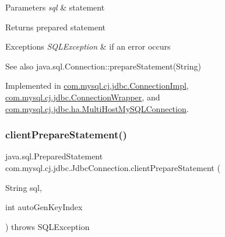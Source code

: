 \begin{DoxyParams}{Parameters}
{\em sql} & statement \\
\hline
\end{DoxyParams}
\begin{DoxyReturn}{Returns}
prepared statement 
\end{DoxyReturn}

\begin{DoxyExceptions}{Exceptions}
{\em S\+Q\+L\+Exception} & if an error occurs \\
\hline
\end{DoxyExceptions}
\begin{DoxySeeAlso}{See also}
java.\+sql.\+Connection\+::prepare\+Statement(\+String) 
\end{DoxySeeAlso}


Implemented in \mbox{\hyperlink{classcom_1_1mysql_1_1cj_1_1jdbc_1_1_connection_impl_a97fe5e29bb844493eb31b4f1c48d8bc7}{com.\+mysql.\+cj.\+jdbc.\+Connection\+Impl}}, \mbox{\hyperlink{classcom_1_1mysql_1_1cj_1_1jdbc_1_1_connection_wrapper_abec439c58b0b01c1590be391a2d1969a}{com.\+mysql.\+cj.\+jdbc.\+Connection\+Wrapper}}, and \mbox{\hyperlink{classcom_1_1mysql_1_1cj_1_1jdbc_1_1ha_1_1_multi_host_my_s_q_l_connection_aad5b9594841a4c935130b225d0c3d686}{com.\+mysql.\+cj.\+jdbc.\+ha.\+Multi\+Host\+My\+S\+Q\+L\+Connection}}.

\mbox{\label{interfacecom_1_1mysql_1_1cj_1_1jdbc_1_1_jdbc_connection_a1d01e4f2fd60084794906cc9a1c24c24}} 
\subsubsection{\texorpdfstring{client\+Prepare\+Statement()}{clientPrepareStatement()}\hspace{0.1cm}{\footnotesize\ttfamily [2/6]}}
{\footnotesize\ttfamily java.\+sql.\+Prepared\+Statement com.\+mysql.\+cj.\+jdbc.\+Jdbc\+Connection.\+client\+Prepare\+Statement (\begin{DoxyParamCaption}\item[{String}]{sql,  }\item[{int}]{auto\+Gen\+Key\+Index }\end{DoxyParamCaption}) throws S\+Q\+L\+Exception}

